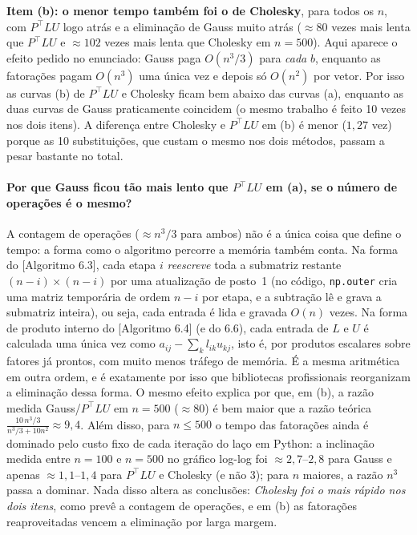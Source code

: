 \documentclass{article}
\newcommand{\T}{^{\top}}
\newcommand{\burden}[1]{\textsf{\footnotesize[#1]}}
\theoremstyle{remark}
\begin{document}
\textbf{Item (b): o menor tempo também foi o de Cholesky}, para todos os $n$, com $P\T LU$ logo atrás e a
eliminação de Gauss muito atrás ($\approx 80$ vezes mais lenta que $P\T LU$ e $\approx 102$ vezes mais lenta que
Cholesky em $n=500$). Aqui aparece o efeito pedido no enunciado: Gauss paga $O(n^3/3)$ para \emph{cada} $b$, enquanto
as fatorações pagam $O(n^3)$ uma única vez e depois só $O(n^2)$ por vetor. Por isso as curvas (b) de $P\T LU$ e Cholesky
ficam bem abaixo das curvas (a), enquanto as duas curvas de Gauss praticamente coincidem (o mesmo trabalho é feito 10 vezes
nos dois itens). A diferença entre Cholesky e $P\T LU$ em (b) é menor ($1{,}27$ vez) porque as 10 substituições,
que custam o mesmo nos dois métodos, passam a pesar bastante no total.

\paragraph{Por que Gauss ficou tão mais lento que $P\T LU$ em (a), se o número de operações é o mesmo?}
A contagem de operações ($\approx n^3/3$ para ambos) não é a única coisa que define o tempo: a forma como o algoritmo
percorre a memória também conta. Na forma do \burden{Algoritmo 6.3}, cada etapa $i$ \emph{reescreve} toda a submatriz restante
$(n-i)\times(n-i)$ por uma atualização de posto~1 (no código, \texttt{np.outer} cria uma matriz temporária de ordem $n-i$
por etapa, e a subtração lê e grava a submatriz inteira), ou seja, cada entrada é lida e gravada $O(n)$ vezes.
Na forma de produto interno do \burden{Algoritmo 6.4} (e do 6.6), cada entrada de $L$ e $U$ é calculada uma única vez como
$a_{ij}-\sum_k l_{ik}u_{kj}$, isto é, por produtos escalares sobre fatores já prontos, com muito menos tráfego de memória.
É a mesma aritmética em outra ordem, e é exatamente por isso que bibliotecas profissionais reorganizam a eliminação
dessa forma. O mesmo efeito explica por que, em (b), a razão medida Gauss/$P\T LU$ em $n=500$ ($\approx 80$) é bem maior que a razão
teórica $\frac{10\,n^3/3}{n^3/3+10n^2}\approx 9{,}4$. Além disso, para $n\le500$ o tempo das fatorações ainda é dominado pelo custo fixo de cada
iteração do laço em Python: a inclinação medida entre $n=100$ e $n=500$ no gráfico log-log foi $\approx 2{,}7$--$2{,}8$ para
Gauss e apenas $\approx 1{,}1$--$1{,}4$ para $P\T LU$ e Cholesky (e não $3$); para $n$ maiores, a razão $n^3$
passa a dominar. Nada disso altera as conclusões: \emph{Cholesky foi o mais rápido nos dois itens}, como prevê a contagem
de operações, e em (b) as fatorações reaproveitadas vencem a eliminação por larga margem.
\end{document}
